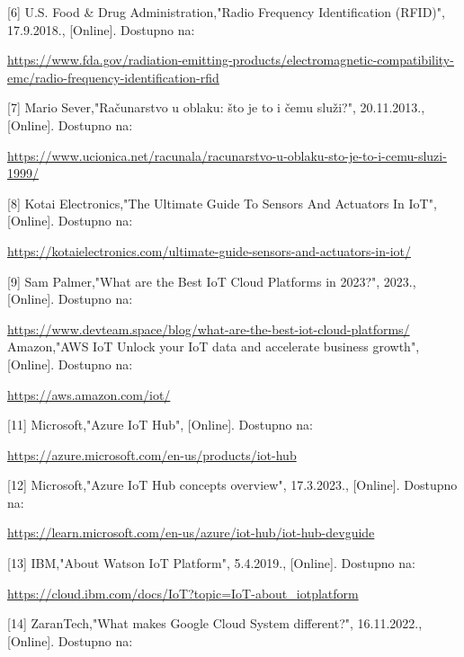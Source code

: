 \documentclass[times, utf8, zavrsni]{fer}
\begin{document}
[6] U.S. Food \& Drug Administration,"Radio Frequency Identification (RFID)", 17.9.2018., [Online].
Dostupno na:

 \href{https://www.fda.gov/radiation-emitting-products/electromagnetic-compatibility-emc/radio-frequency-identification-rfid}{https://www.fda.gov/radiation-emitting-products/electromagnetic-compatibility-emc/radio-frequency-identification-rfid}

[7] Mario Sever,"Računarstvo u oblaku: što je to i čemu služi?", 20.11.2013., [Online].
Dostupno na:

 \href{https://www.ucionica.net/racunala/racunarstvo-u-oblaku-sto-je-to-i-cemu-sluzi-1999/}{https://www.ucionica.net/racunala/racunarstvo-u-oblaku-sto-je-to-i-cemu-sluzi-1999/}

[8] Kotai Electronics,"The Ultimate Guide To Sensors And Actuators In IoT", [Online].
Dostupno na:

 \href{https://kotaielectronics.com/ultimate-guide-sensors-and-actuators-in-iot/}{https://kotaielectronics.com/ultimate-guide-sensors-and-actuators-in-iot/}

[9] Sam Palmer,"What are the Best IoT Cloud Platforms in 2023?", 2023., [Online].
Dostupno na:

\href{https://www.devteam.space/blog/what-are-the-best-iot-cloud-platforms/}{https://www.devteam.space/blog/what-are-the-best-iot-cloud-platforms/}
\newpage
[10] Amazon,"AWS IoT Unlock your IoT data and accelerate business growth", [Online].
Dostupno na:

 \href{https://aws.amazon.com/iot/}{https://aws.amazon.com/iot/}

[11] Microsoft,"Azure IoT Hub", [Online].
Dostupno na:

\href{https://azure.microsoft.com/en-us/products/iot-hub}{https://azure.microsoft.com/en-us/products/iot-hub}

[12] Microsoft,"Azure IoT Hub concepts overview", 17.3.2023., [Online].
Dostupno na:

 \href{https://learn.microsoft.com/en-us/azure/iot-hub/iot-hub-devguide}{https://learn.microsoft.com/en-us/azure/iot-hub/iot-hub-devguide}

[13] IBM,"About Watson IoT Platform", 5.4.2019., [Online].
Dostupno na:

 \href{https://cloud.ibm.com/docs/IoT?topic=IoT-about_iotplatform}{https://cloud.ibm.com/docs/IoT?topic=IoT-about\_iotplatform}

 
[14] ZaranTech,"What makes Google Cloud System different?", 16.11.2022., [Online].
Dostupno na:
\end{document}

